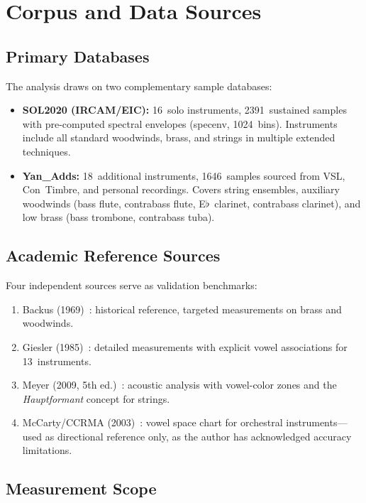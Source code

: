 \documentclass[journal]{IEEEtran}
\begin{document}
\section{Corpus and Data Sources}
\label{sec:corpus}

\subsection{Primary Databases}

The analysis draws on two complementary sample databases:

\begin{itemize}
\item \textbf{SOL2020 (IRCAM/EIC):} 16~solo instruments, \num{2391}~sustained samples with pre-computed spectral envelopes (specenv, \num{1024}~bins). Instruments include all standard woodwinds, brass, and strings in multiple extended techniques.
\item \textbf{Yan\_Adds:} 18~additional instruments, \num{1646}~samples sourced from VSL, Con~Timbre, and personal recordings. Covers string ensembles, auxiliary woodwinds (bass flute, contrabass flute, E$\flat$~clarinet, contrabass clarinet), and low brass (bass trombone, contrabass tuba).
\end{itemize}

\subsection{Academic Reference Sources}

Four independent sources serve as validation benchmarks:
\begin{enumerate}
\item Backus (1969)~\cite{backus1969}: historical reference, targeted measurements on brass and woodwinds.
\item Giesler (1985)~\cite{giesler1985}: detailed measurements with explicit vowel associations for 13~instruments.
\item Meyer (2009, 5th ed.)~\cite{meyer2009}: acoustic analysis with vowel-color zones and the \emph{Hauptformant} concept for strings.
\item McCarty/CCRMA (2003)~\cite{mccarty2003}: vowel space chart for orchestral instruments---used as directional reference only, as the author has acknowledged accuracy limitations.
\end{enumerate}

\subsection{Measurement Scope}
\end{document}
